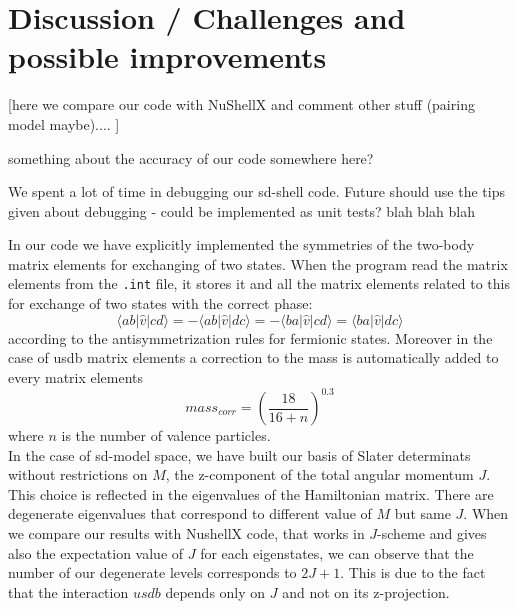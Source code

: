 \documentclass[twoside]{article}
\newcommand{\bra}[1]{\langle #1 |}
\newcommand{\ket}[1]{| #1 \rangle}
\begin{document}


\section{Discussion / Challenges and possible improvements}

[here we compare our code with NuShellX and comment other stuff (pairing model maybe).... ]


 something about the accuracy of our code somewhere here?

We spent a lot of time in debugging our sd-shell code. Future should use the tips given about debugging - could be implemented as unit tests? blah blah blah



In our code we have explicitly implemented the symmetries of the two-body matrix elements for exchanging of two states. When the program read the matrix elements from the \texttt{.int} file, it stores it and all the matrix elements related to this for exchange of two states with the correct phase:
\begin{equation}
\bra{ab} \hat v \ket{cd} = -\bra{ab} \hat v \ket{dc}= -\bra{ba} \hat v \ket{cd}= \bra{ba} \hat v \ket{dc}
\end{equation}
according to the antisymmetrization rules for fermionic states. Moreover in the case of usdb matrix elements a correction to the mass is automatically added to every matrix elements
\begin{equation}
mass_{corr} = \left(\frac{18}{16+n} \right)^{0.3}
\end{equation}
where $n$ is the number of valence particles.
\\

In the case of sd-model space, we have built our basis of Slater determinats without restrictions on $M$, the z-component of the total angular momentum $J$. This choice is reflected in the eigenvalues of the Hamiltonian matrix. There are degenerate eigenvalues that correspond to different value of $M$ but same $J$. When we compare our results with NushellX code, that works in $J$-scheme and gives also the expectation value of $J$ for each eigenstates, we can observe that the number of our degenerate levels corresponds to $2J+1$. This is due to the fact that the interaction $usdb$ depends only on $J$ and not on its z-projection.
\end{document}
